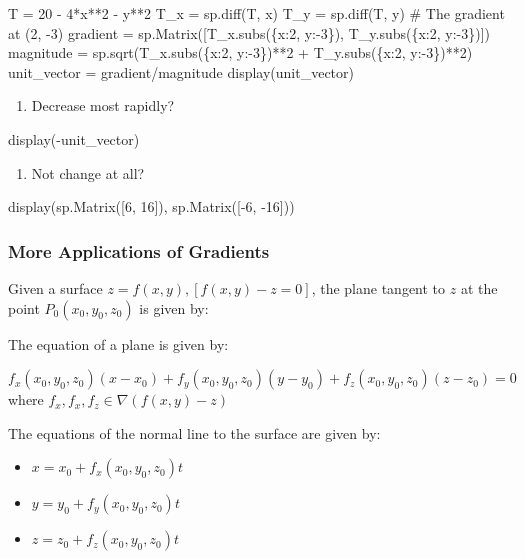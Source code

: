 \documentclass[
  letterpaper,
  DIV=11,
  numbers=noendperiod]{scrartcl}
\newenvironment{Shaded}{\begin{snugshade}}{\end{snugshade}}
\newcommand{\NormalTok}[1]{\textcolor[rgb]{0.00,0.23,0.31}{#1}}
\providecommand{\tightlist}{%
  \setlength{\itemsep}{0pt}\setlength{\parskip}{0pt}}\usepackage{longtable,booktabs,array}
\begin{document}
\begin{Shaded}
\begin{Highlighting}[numbers=left,,]
\NormalTok{T = 20 {-} 4*x**2 {-} y**2}
\NormalTok{T\_x = sp.diff(T, x)}
\NormalTok{T\_y = sp.diff(T, y)}
\NormalTok{\# The gradient at (2, {-}3)}
\NormalTok{gradient = sp.Matrix([T\_x.subs(\{x:2, y:{-}3\}), T\_y.subs(\{x:2, y:{-}3\})])}
\NormalTok{magnitude = sp.sqrt(T\_x.subs(\{x:2, y:{-}3\})**2 + T\_y.subs(\{x:2, y:{-}3\})**2)}
\NormalTok{unit\_vector = gradient/magnitude}
\NormalTok{display(unit\_vector)}
\end{Highlighting}
\end{Shaded}

\begin{enumerate}
\def\labelenumi{\alph{enumi}.}
\setcounter{enumi}{1}
\tightlist
\item
  Decrease most rapidly?
\end{enumerate}

\begin{Shaded}
\begin{Highlighting}[numbers=left,,]
\NormalTok{display({-}unit\_vector)}
\end{Highlighting}
\end{Shaded}

\begin{enumerate}
\def\labelenumi{\alph{enumi}.}
\setcounter{enumi}{2}
\tightlist
\item
  Not change at all?
\end{enumerate}

\begin{Shaded}
\begin{Highlighting}[numbers=left,,]
\NormalTok{display(sp.Matrix([6, 16]), sp.Matrix([{-}6, {-}16]))}
\end{Highlighting}
\end{Shaded}

\subsubsection{More Applications of
Gradients}\label{more-applications-of-gradients}

Given a surface \(z=f(x, y), [f(x, y)-z=0]\), the plane tangent to \(z\)
at the point \(P_0(x_0, y_0, z_0)\) is given by:

The equation of a plane is given by:

\(f_x(x_0, y_0, z_0)(x-x_0)+f_y(x_0, y_0, z_0)(y-y_0)+f_z(x_0, y_0, z_0)(z-z_0) = 0\)
where \(f_x, f_x, f_z \in \nabla (f(x, y)-z)\)

The equations of the normal line to the surface are given by:

\begin{itemize}
\tightlist
\item
  \(x = x_0 + f_x(x_0, y_0, z_0)t\)
\item
  \(y = y_0 + f_y(x_0, y_0, z_0)t\)
\item
  \(z = z_0 + f_z(x_0, y_0, z_0)t\)
\end{itemize}
\end{document}
